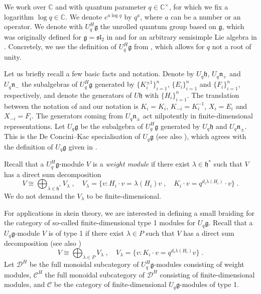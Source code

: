 \documentclass[12pt,dvipsnames]{article}
\numberwithin{equation}{section}
\theoremstyle{definition}
\newcommand{\cat}[1]{\mathcal{#1}}
\newcommand{\C}{\ensuremath{\mathbb{C}}}
\newcommand{\1}{\ensuremath{\mathbbm{1}}}
\begin{document}
We work over $\C$ and with quantum parameter $q\in\C^\times$, for which we fix a logarithm $\log q \in \mathbb{C}$.
We denote $e^{a\log q}$ by $q^a$, where $a$ can be a number or an operator. We denote with $U_q^H\mathfrak{g}$ the unrolled quantum group based on $\mathfrak{g}$, which was originally defined for $\mathfrak{g} = \mathfrak{sl}_2$ in \cite{GPT07} and for an arbitrary semisimple Lie algebra in \cite{GP10}. Concretely, 
we use the definition of $U_q^H\mathfrak{g}$ from \cite[Def.\,3.1]{Ru19}, which allows for $q$ not a root of unity.

Let us briefly recall a few basic facts and notation. 
Denote by $U_q\mathfrak{h}$, $U_q\mathfrak{n}_+$ and $U_q\mathfrak{n}_-$ the subalgebras of $U_q^H\mathfrak{g}$ generated by $\{K_i^{\pm1}\}_{i=1}^n$, $\{E_i\}_{i=1}^n$ and $\{F_i\}_{i=1}^n$, respectively, and denote the generators of $U\mathfrak{h}$ with $\{H_i\}_{i=1}^n$. The translation between the notation of \cite{Ru19} and our notation is $K_i = K_i$, $K_{-i} = K_i^{-1}$, $X_i = E_i$ and $X_{-i}=  F_i$. The generators coming from $U_q\mathfrak{n}_{\pm}$ act nilpotently in finite-dimensional representations. Let $U_q\mathfrak{g}$ be the subalgebra of $U_q^H\mathfrak{g}$ generated by $U_q\mathfrak{h}$ and $U_q\mathfrak{n}_\pm$. This is the De Concini--Kac specialisation of $U_q\mathfrak{g}$ \cite{DK90} (see also \cite[p.\,6]{Ru19}), which agrees with the definition of $U_q\mathfrak{g}$ given in \cite[Sec.\,6.1.2]{KS97}.

Recall that a $U_q^H\mathfrak{g}$-module $V$ is a \emph{weight module} if there exist $\lambda\in\mathfrak{h}^\ast$ such that $V$ has a direct sum decomposition \cite[Sec.\,5.3]{GP10}
\begin{equation}\label{eq:weight module}
    V \cong \bigoplus_{\lambda\in\mathfrak{h}^\ast} V_\lambda \;,\quad V_\lambda = \{v: H_i\cdot v = \lambda(H_i) v \;,\quad K_i\cdot v = q^{d_i\lambda(H_i)}\cdot v\}\;.
\end{equation}
We do not demand the $V_\lambda$ to be finite-dimensional.
    
For applications in skein theory, we are interested in defining a small braiding for the category of so-called finite-dimensional type 1 modules for $U_q\mathfrak{g}$. Recall that a $U_q\mathfrak{g}$-module $V$ is of type 1 if there exist $\lambda\in P$ such that $V$ has a direct sum decomposition \cite[p.\,314]{CP94} (see also \cite[p.\,4]{Cha94})
\begin{equation}\label{eq: type 1}
        V \cong \bigoplus_{\lambda\in P} V_\lambda \;,\quad V_\lambda = \{v: K_i\cdot v = q^{d_i\lambda(H_i)} v \}\;.
\end{equation}
Let $\cat{D}^H$ be the full monoidal subcategory of $U_q^H\mathfrak{g}$-modules consisting of weight modules, $\cat{C}^H$ the full monoidal subcategory of $\cat{D}^H$ consisting of finite-dimensional modules, and $\cat{C}$ be the category of finite-dimensional $U_q\mathfrak{g}$-modules of type 1.
\end{document}
